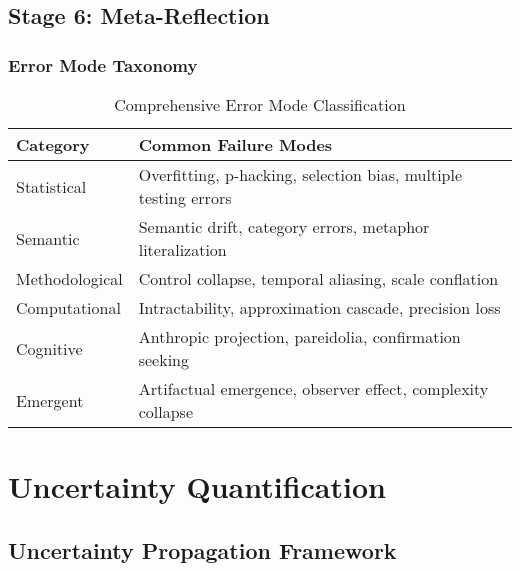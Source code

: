 \documentclass[12pt,oneside]{memoir}
\theoremstyle{plain}
\theoremstyle{definition}
\theoremstyle{remark}
\begin{document}
\section{Stage 6: Meta-Reflection}

\subsection{Error Mode Taxonomy}

\begin{table}[h]
\centering
\caption{Comprehensive Error Mode Classification}
\begin{tabular}{L{2.5cm}L{8cm}}
\toprule
\textbf{Category} & \textbf{Common Failure Modes} \\
\midrule
Statistical & Overfitting, p-hacking, selection bias, multiple testing errors \\
Semantic & Semantic drift, category errors, metaphor literalization \\
Methodological & Control collapse, temporal aliasing, scale conflation \\
Computational & Intractability, approximation cascade, precision loss \\
Cognitive & Anthropic projection, pareidolia, confirmation seeking \\
Emergent & Artifactual emergence, observer effect, complexity collapse \\
\bottomrule
\end{tabular}
\end{table}

\chapter{Uncertainty Quantification}

\section{Uncertainty Propagation Framework}
\end{document}
